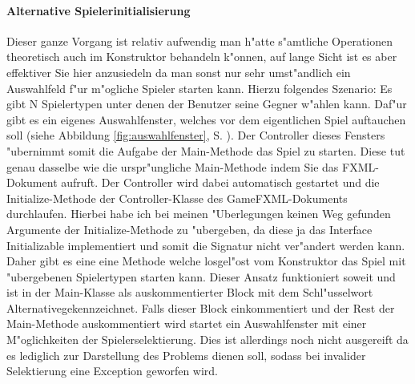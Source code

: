 \paragraph{Alternative Spielerinitialisierung}
Dieser ganze Vorgang ist relativ aufwendig man h"atte s"amtliche Operationen theoretisch auch im Konstruktor behandeln k"onnen, auf lange Sicht ist es aber effektiver Sie hier anzusiedeln da man sonst nur sehr umst"andlich ein Auswahlfeld f"ur m"ogliche Spieler starten kann. Hierzu folgendes Szenario: Es gibt N Spielertypen unter denen der Benutzer seine Gegner w"ahlen kann. Daf"ur gibt es ein eigenes Auswahlfenster, welches vor dem eigentlichen Spiel auftauchen soll (siehe Abbildung \ref{fig:auswahlfenster}, S. \pageref{fig:auswahlfenster}). Der Controller dieses Fensters "ubernimmt somit die Aufgabe der Main-Methode das Spiel zu starten. Diese tut genau dasselbe wie die urspr"ungliche Main-Methode indem Sie das FXML-Dokument aufruft. Der Controller wird dabei automatisch gestartet und die Initialize-Methode der Controller-Klasse des GameFXML-Dokuments durchlaufen. Hierbei habe ich bei meinen "Uberlegungen keinen Weg gefunden Argumente der Initialize-Methode zu "ubergeben, da diese ja das Interface Initializable implementiert und somit die Signatur nicht ver"andert werden kann. Daher gibt es eine eine Methode welche losgel"ost vom Konstruktor das Spiel mit "ubergebenen Spielertypen starten kann. Dieser Ansatz funktioniert soweit und ist in der Main-Klasse als auskommentierter Block mit dem Schl"usselwort \glqq Alternative\grqq  gekennzeichnet. Falls dieser Block einkommentiert und der Rest der Main-Methode auskommentiert wird startet ein Auswahlfenster mit einer M"oglichkeiten der Spielerselektierung. Dies ist allerdings noch nicht ausgereift da es lediglich zur Darstellung des Problems dienen soll, sodass bei invalider Selektierung eine Exception geworfen wird.

